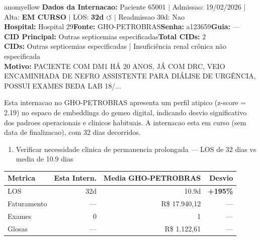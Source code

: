 \documentclass[a4paper,10pt]{article}
\begin{document}
\newpage

\begin{anomalycard}[Internacao 166085 | GHO-PETROBRAS | MODERADO (z=2.19)]{anomyellow}
\textbf{Dados da Internacao:} Paciente 65001 $\mid$ Admissao: 19/02/2026 $\mid$ Alta: \textcolor{anomorange}{\textbf{EM CURSO}} $\mid$ LOS: \textbf{32d \textcolor{anomorange}{$\circlearrowleft$}} $\mid$ Readmissao 30d: Nao\\
\textbf{Hospital:} Hospital 29\quad\textbf{Fonte:} GHO-PETROBRAS\quad\textbf{Senha:} a123659\quad\textbf{Guia:} ---\\
\textbf{CID Principal:} {\small Outras septicemias especificadas}\quad\textbf{Total CIDs:} 2\\

\textbf{CIDs:} {\scriptsize Outras septicemias especificadas | Insuficiência renal crônica não especificada}\\

\textbf{Motivo:} {\scriptsize PACIENTE COM DM1 HÁ 20 ANOS, JÁ COM DRC, VEIO ENCAMINHADA DE NEFRO ASSISTENTE PARA DIÁLISE DE URGÊNCIA, POSSUI EXAMES BEDA LAB 18/...}\\

\vspace{2pt}\begin{tcolorbox}[colback=severityred!20,colframe=anomyellow,title={\textbf{Interpretacao de Negocio}},fonttitle=\bfseries\small,left=4pt,right=4pt,top=3pt,bottom=3pt]
{\small Esta internacao no GHO-PETROBRAS apresenta um perfil atipico (z-score = 2.19) no espaco de embeddings do gemeo digital, indicando desvio significativo dos padroes operacionais e clinicos habituais. A internacao esta em curso (sem data de finalizacao), com 32 dias decorridos.}
\end{tcolorbox}
\begin{tcolorbox}[colback=severityyellow!30,colframe=anomorange,title={\textbf{Recomendacoes Especificas}},fonttitle=\bfseries\small,left=4pt,right=4pt,top=3pt,bottom=3pt]
\begin{enumerate}[nosep,leftmargin=16pt]
\item {\small Verificar necessidade clinica de permanencia prolongada --- LOS de 32 dias vs media de 10.9 dias}
\end{enumerate}
\end{tcolorbox}
\begin{center}\begin{tabular}{l r r r}\toprule\textbf{Metrica} & \textbf{Esta Intern.} & \textbf{Media GHO-PETROBRAS} & \textbf{Desvio} \\\midrule
LOS & 32d & 10.9d & \textcolor{anomred}{\textbf{+195\%}} \\
Faturamento & --- & R\$ 17.940,12 & --- \\
Exames & 0 & 1 & --- \\
Glosas & --- & R\$ 1.122,61 & --- \\
\bottomrule\end{tabular}\end{center}


\end{anomalycard}
\end{document}
